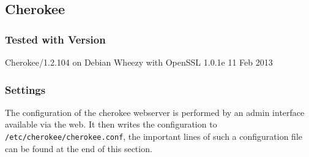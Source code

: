 \subsection{Cherokee}

\subsubsection{Tested with Version}
\begin{itemize*}
    \item Cherokee/1.2.104 on Debian Wheezy with OpenSSL 1.0.1e 11 Feb 2013
\end{itemize*}

\subsubsection{Settings}

The configuration of the cherokee webserver is performed by an admin interface available via the web. It then writes the configuration to \texttt{/etc/cherokee/cherokee.conf}, the important lines of such a configuration file can be found at the end of this section.

